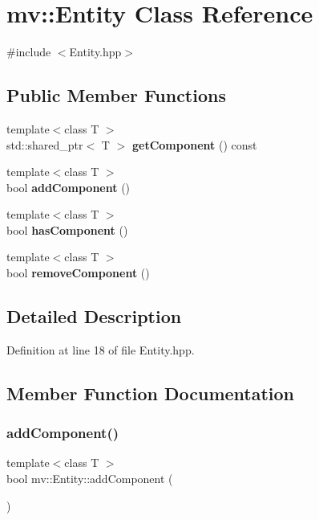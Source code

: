 \section{mv\+:\+:Entity Class Reference}
\label{classmv_1_1_entity}


{\ttfamily \#include $<$Entity.\+hpp$>$}

\subsection*{Public Member Functions}
\begin{DoxyCompactItemize}
\item 
{\footnotesize template$<$class T $>$ }\\std\+::shared\+\_\+ptr$<$ T $>$ \textbf{ get\+Component} () const
\item 
{\footnotesize template$<$class T $>$ }\\bool \textbf{ add\+Component} ()
\item 
{\footnotesize template$<$class T $>$ }\\bool \textbf{ has\+Component} ()
\item 
{\footnotesize template$<$class T $>$ }\\bool \textbf{ remove\+Component} ()
\end{DoxyCompactItemize}


\subsection{Detailed Description}


Definition at line 18 of file Entity.\+hpp.



\subsection{Member Function Documentation}
\mbox{\label{classmv_1_1_entity_a6fe942a0250cfb842fcc5c004d5e139e}} 
\subsubsection{add\+Component()}
{\footnotesize\ttfamily template$<$class T $>$ \\
bool mv\+::\+Entity\+::add\+Component (\begin{DoxyParamCaption}{ }\end{DoxyParamCaption})\hspace{0.3cm}{\ttfamily [inline]}}



